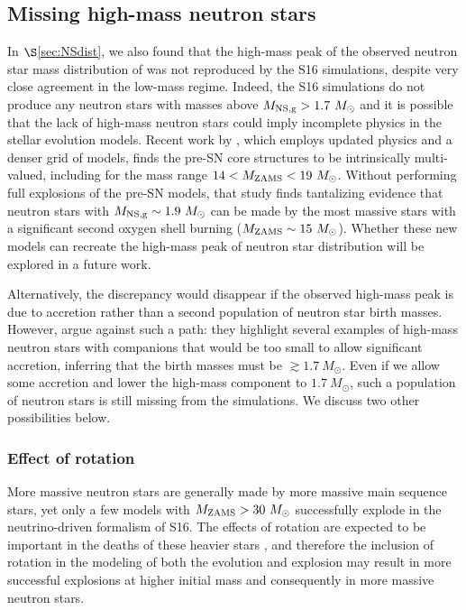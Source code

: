 \documentclass[]{emulateapj}
\newcommand{\Ms}{M_{\odot}}
\newcommand{\Mz}{M_{\rm ZAMS}}
\newcommand{\Mng}{M_{\rm NS, g}}
\begin{document}
\subsection{Missing high-mass neutron stars}
In $\S$\ref{sec:NSdist}, we also found that the high-mass peak of the observed neutron star mass distribution of \citet{Antoniadis2016} was not reproduced by the S16 simulations, despite very close agreement in the low-mass regime.
Indeed, the S16 simulations do not produce any neutron stars with masses above $\Mng > 1.7\ \Ms$ and it is possible that the lack of high-mass neutron stars could imply incomplete physics in the stellar evolution models. Recent work by \citet{Sukhbold2017}, which employs updated physics and a denser grid of models, finds the pre-SN core structures to be intrinsically multi-valued, including for the mass range $14<\Mz<19\ \Ms$. Without performing full explosions of the pre-SN models, that study finds tantalizing evidence that neutron stars with $\Mng\sim1.9\ \Ms$ can be made by the most massive stars with a significant second oxygen shell burning ($\Mz\sim15\ \Ms$). Whether these new models can recreate the high-mass peak of neutron star distribution will be explored in a future work. 

Alternatively, the discrepancy would disappear if the observed high-mass peak is due to accretion rather than a second population of neutron star birth masses. However, \citet{Antoniadis2016} argue against such a path: they highlight several examples of high-mass neutron stars with companions that would be too small to allow significant accretion, inferring that the birth masses must be $\gtrsim 1.7~\Ms$. Even if we allow some accretion and lower the high-mass component to $1.7~\Ms$, such a population of neutron stars is still missing from the simulations. We discuss two other possibilities below.

\subsubsection{Effect of rotation}
\label{sec:rot}
More massive neutron stars are generally made by more massive main sequence stars, yet only a few models with $\Mz>30\ \Ms$ successfully explode in the neutrino-driven formalism of S16. The effects of rotation are expected to be important in the deaths of these heavier stars \citep[e.g.,][]{Heger2005}, and therefore the inclusion of rotation in the modeling of both the evolution and explosion may result in more successful explosions at higher initial mass and consequently in more massive neutron stars.
\end{document}
